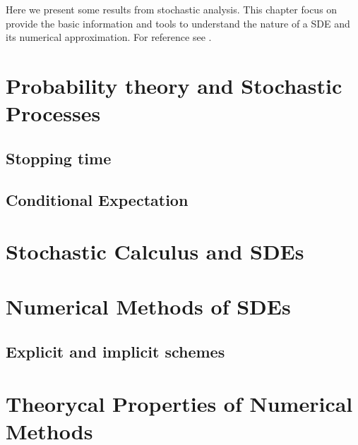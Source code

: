 	Here we present some results from stochastic analysis. This chapter focus on
provide the basic information and tools to understand the nature of a SDE and its numerical approximation. For reference
see \cite{Arnold1979, Kloeden1992, Williams1991, Milstein2004, Resnick2003}.

\section{Probability theory and Stochastic Processes}
		
		
\subsection{Stopping time}
	
		\subsection{Conditional Expectation}
		
\section{Stochastic Calculus and SDEs}
		
\section{Numerical Methods of SDEs}
	
	\subsection{Explicit and implicit schemes}
		
\section{Theorycal Properties of Numerical Methods}
		
